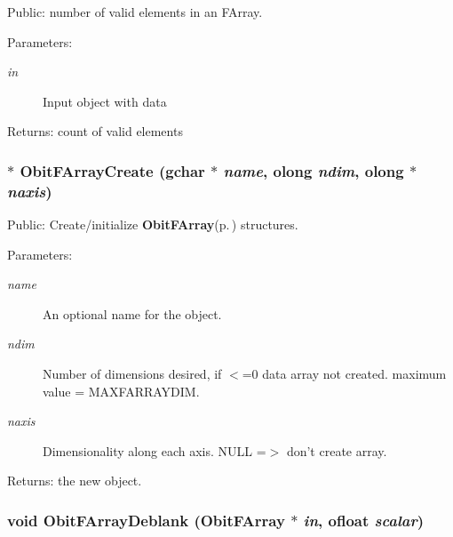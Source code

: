 Public: number of valid elements in an FArray. 

\begin{Desc}
\item[Parameters:]
\begin{description}
\item[{\em in}]Input object with data \end{description}
\end{Desc}
\begin{Desc}
\item[Returns:]count of valid elements \end{Desc}
\subsubsection{$\ast$ Obit\-FArray\-Create (gchar $\ast$ {\em name}, {\bf olong} {\em ndim}, {\bf olong} $\ast$ {\em naxis})}\label{ObitFArray_8c_a19}


Public: Create/initialize {\bf Obit\-FArray}{\rm (p.\,\pageref{structObitFArray})} structures. 

\begin{Desc}
\item[Parameters:]
\begin{description}
\item[{\em name}]An optional name for the object. \item[{\em ndim}]Number of dimensions desired, if $<$=0 data array not created. maximum value = MAXFARRAYDIM. \item[{\em naxis}]Dimensionality along each axis. NULL =$>$ don't create array. \end{description}
\end{Desc}
\begin{Desc}
\item[Returns:]the new object. \end{Desc}
\subsubsection{\setlength{\rightskip}{0pt plus 5cm}void Obit\-FArray\-Deblank ({\bf Obit\-FArray} $\ast$ {\em in}, {\bf ofloat} {\em scalar})}\label{ObitFArray_8c_a27}


